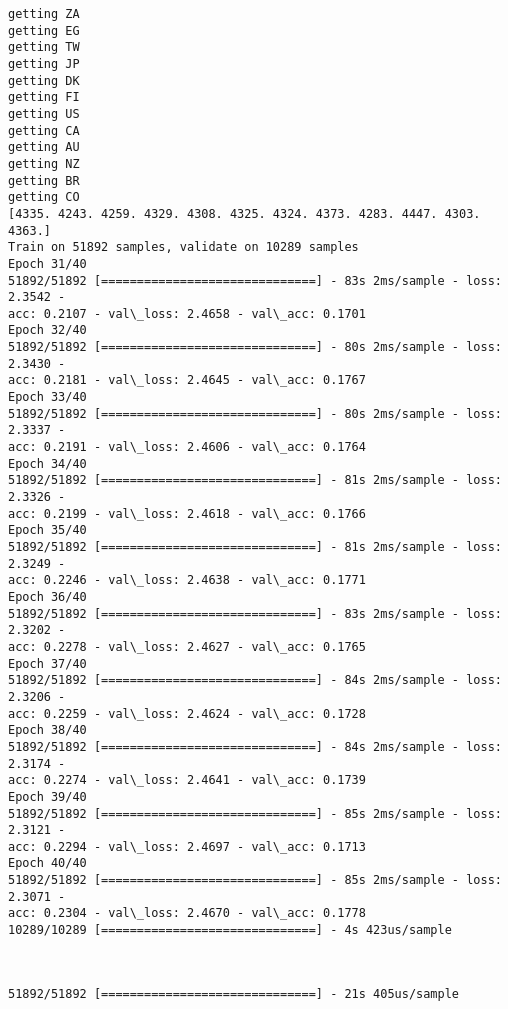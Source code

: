 \documentclass[11pt]{article}
\begin{document}
    \begin{Verbatim}[commandchars=\\\{\}]
getting ZA
getting EG
getting TW
getting JP
getting DK
getting FI
getting US
getting CA
getting AU
getting NZ
getting BR
getting CO
[4335. 4243. 4259. 4329. 4308. 4325. 4324. 4373. 4283. 4447. 4303. 4363.]
Train on 51892 samples, validate on 10289 samples
Epoch 31/40
51892/51892 [==============================] - 83s 2ms/sample - loss: 2.3542 -
acc: 0.2107 - val\_loss: 2.4658 - val\_acc: 0.1701
Epoch 32/40
51892/51892 [==============================] - 80s 2ms/sample - loss: 2.3430 -
acc: 0.2181 - val\_loss: 2.4645 - val\_acc: 0.1767
Epoch 33/40
51892/51892 [==============================] - 80s 2ms/sample - loss: 2.3337 -
acc: 0.2191 - val\_loss: 2.4606 - val\_acc: 0.1764
Epoch 34/40
51892/51892 [==============================] - 81s 2ms/sample - loss: 2.3326 -
acc: 0.2199 - val\_loss: 2.4618 - val\_acc: 0.1766
Epoch 35/40
51892/51892 [==============================] - 81s 2ms/sample - loss: 2.3249 -
acc: 0.2246 - val\_loss: 2.4638 - val\_acc: 0.1771
Epoch 36/40
51892/51892 [==============================] - 83s 2ms/sample - loss: 2.3202 -
acc: 0.2278 - val\_loss: 2.4627 - val\_acc: 0.1765
Epoch 37/40
51892/51892 [==============================] - 84s 2ms/sample - loss: 2.3206 -
acc: 0.2259 - val\_loss: 2.4624 - val\_acc: 0.1728
Epoch 38/40
51892/51892 [==============================] - 84s 2ms/sample - loss: 2.3174 -
acc: 0.2274 - val\_loss: 2.4641 - val\_acc: 0.1739
Epoch 39/40
51892/51892 [==============================] - 85s 2ms/sample - loss: 2.3121 -
acc: 0.2294 - val\_loss: 2.4697 - val\_acc: 0.1713
Epoch 40/40
51892/51892 [==============================] - 85s 2ms/sample - loss: 2.3071 -
acc: 0.2304 - val\_loss: 2.4670 - val\_acc: 0.1778
10289/10289 [==============================] - 4s 423us/sample
    \end{Verbatim}

    \begin{center}
    \end{center}
    { \hspace*{\fill} \\}
    
    \begin{Verbatim}[commandchars=\\\{\}]
51892/51892 [==============================] - 21s 405us/sample
    \end{Verbatim}

    \begin{center}
    \end{center}
    { \hspace*{\fill} \\}
    
\end{document}
